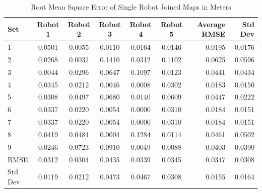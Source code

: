 \documentclass[12pt]{report}
\begin{document}
\begin{center}
\begin{table}[h]
  \caption{Root Mean Square Error of Single Robot Joined Maps in
    Meters}
  \begin{tabular}{| l | c | c | c | c | c || r ||r |}
    \hline Set & Robot 1 & Robot 2 & Robot 3 & Robot 4 & Robot 5 &
    Average RMSE & Std Dev \\ \hline \hline 1 & 0.0501 & 0.0055 &
    0.0110 & 0.0164 & 0.0146 & 0.0195 & 0.0176\\ \hline 2 & 0.0268 &
    0.0031 & 0.1410 & 0.0312 & 0.1102 & 0.0625 & 0.0596\\ \hline 3 &
    0.0044 & 0.0296 & 0.0647 & 0.1097 & 0.0123 & 0.0441 &
    0.0434\\ \hline 4 & 0.0345 & 0.0212 & 0.0046 & 0.0008 & 0.0302 &
    0.0183 & 0.0150\\ \hline 5 & 0.0308 & 0.0497 & 0.0680 & 0.0140 &
    0.0609 & 0.0447 & 0.0222\\ \hline 6 & 0.0337 & 0.0220 & 0.0054 &
    0.0000 & 0.0310 & 0.0184 & 0.0151\\ \hline 7 & 0.0337 & 0.0220 &
    0.0054 & 0.0000 & 0.0310 & 0.0184 & 0.0151\\ \hline 8 & 0.0419 &
    0.0484 & 0.0004 & 0.1284 & 0.0114 & 0.0461 & 0.0502\\ \hline 9 &
    0.0246 & 0.0723 & 0.0910 & 0.0049 & 0.0088 & 0.0403 &
    0.0390\\ \hline \hline RMSE & 0.0312 & 0.0304 & 0.0435 & 0.0339 &
    0.0345 & 0.0347 & 0.0308\\ \hline Std Dev & 0.0119 & 0.0212 &
    0.0473 & 0.0467 & 0.0308 & 0.0155 & 0.0164\\ \hline \hline
  \end{tabular}
  \end{table}
\end{center}
\end{document}

